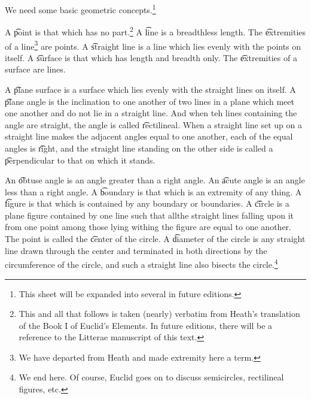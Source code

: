 

We need some basic geometric concepts.\footnote{This sheet will be expanded into several in future editions.}


A \t{point} is that which has no part.\footnote{This and all that follows is taken (nearly) verbatim from Heath's translation of the Book I of Euclid's Elements. In future editions, there will be a reference to the Litterae manuscript of this text.}
A \t{line} is a breadthless length.
The \t{extremities of a line}\footnote{We have departed from Heath and made extremity here a term.} are points.
A \t{straight line} is a line which lies evenly with the points on itself.
A \t{surface} is that which has length and breadth only.
The \t{extremities of a surface} are lines.

A \t{plane surface} is a surface which lies evenly with the straight lines on itself.
A \t{plane angle} is the inclination to one another of two lines in a plane which meet one another and do not lie in a straight line.
And when teh lines containing the angle are straight, the angle is called \t{rectilineal}.
  When a straight line set up on a straight line makes the adjacent angles equal to one another, each of the equal angles is \t{right}, and the straight line standing on the other side is called a \t{perpendicular} to that on which it stands.

  An \t{obtuse angle} is an angle greater than a right angle.
  An \t{acute angle} is an angle less than a right angle.
  A \t{boundary} is that which is an extremity of any thing.
  A \t{figure} is that which is contained by any boundary or boundaries.
  A \t{circle} is a plane figure contained by one line such that allthe straight lines falling upon it from one point among those lying withing the figure are equal to one another.
  The point is called the \t{center} of the circle.
  A \t{diameter} of the circle is any straight line drawn through the center and terminated in both directions by the circumference of the circle, and such a straight line also bisects the circle.\footnote{We end here. Of course, Euclid goes on to discuss semicircles, rectilineal figures, etc.}
